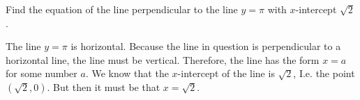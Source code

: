 \documentclass[11pt,letterpaper]{article}
\begin{document}
\newpage



 Find the equation of the line perpendicular to the line $y= \pi$ with $x$-intercept $\sqrt{2}$. \pspace

\sol The line $y= \pi$ is horizontal. Because the line in question is perpendicular to a horizontal line, the line must be vertical. Therefore, the line has the form $x= a$ for some number $a$. We know that the $x$-intercept of the line is $\sqrt{2}$, I.e. the point $(\sqrt{2}, 0)$. But then it must be that $x= \sqrt{2}$. 
\end{document}
